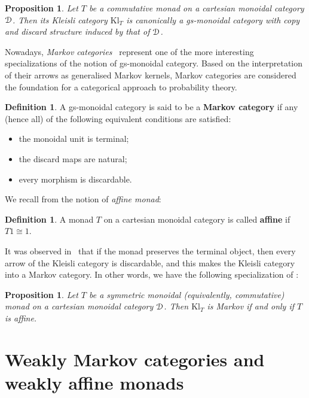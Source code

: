 \documentclass[a4paper,UKenglish,numberwithinsect,cleveref, autoref, thm-restate]{lipics-v2021}
\theoremstyle{plain} %
\newtheorem{myproposition}[mytheorem]{Proposition}
\theoremstyle{definition} %
\newtheorem{mydefinition}[mytheorem]{Definition}
\begin{document}
\begin{myproposition}\label{monoidalgs}
 Let $T$ be a commutative monad on a cartesian monoidal category $\mathcal{D}$. 
 Then its Kleisli category $\mathrm{Kl}_T$ is canonically a gs-monoidal category with copy and discard structure induced by that of $\mathcal{D}$.
\end{myproposition}

Nowadays, \emph{Markov categories}~\cite{Fritz_2020} represent one of the more interesting specializations of the notion of gs-monoidal category. Based on the interpretation of their arrows
 as generalised Markov kernels, Markov categories are considered the foundation for a categorical approach to probability theory.

\begin{mydefinition}
 A gs-monoidal category is said to be a \textbf{Markov category} if any (hence all) of the following equivalent conditions are satisfied:
 \begin{itemize}
  \item the monoidal unit is terminal;
  \item the discard maps are natural;
  \item every morphism is discardable.
 \end{itemize}
\end{mydefinition}


We recall from \cite{Kock71,Jacobs1994} the notion of \emph{affine monad}:

\begin{mydefinition}
 A monad $T$ on a cartesian monoidal category is called \textbf{affine} if $T1\cong 1$.
\end{mydefinition}

It was observed in~\cite[Corollary~3.2]{Fritz_2020} that if the monad preserves the terminal object, then every arrow of the Kleisli category is discardable, and this makes the Kleisli category into a Markov category.
In other words, we have the following specialization of :

\begin{myproposition}\label{affinemarkov}
Let $T$ be a symmetric monoidal (equivalently, commutative) monad on a cartesian monoidal category $\mathcal{D}$. Then $\mathrm{Kl}_T$ is Markov if and only if $T$ is affine.
\end{myproposition}
 

\section{Weakly Markov categories and weakly affine monads}
\end{document}
